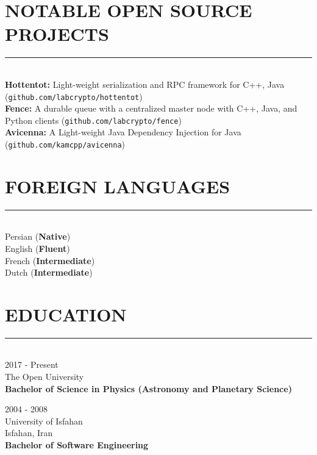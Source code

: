 \documentclass[10pt,a4paper]{article}
\begin{document}

\section{NOTABLE OPEN SOURCE PROJECTS}
\noindent \rule {18.0cm}{0.2pt} \\
    \textbullet \hspace{0.05cm} \textbf{Hottentot:} Light-weight serialization and RPC framework for C++, Java (\texttt{github.com/labcrypto/hottentot}) \\
    \textbullet \hspace{0.05cm} \textbf{Fence:} A durable queue with a centralized master node with C++, Java, and Python clients (\texttt{github.com/labcrypto/fence}) \\
    \textbullet \hspace{0.05cm} \textbf{Avicenna:} A Light-weight Java Dependency Injection for Java  (\texttt{github.com/kamcpp/avicenna}) \\
    
\section{FOREIGN LANGUAGES}
\noindent \rule {18.0cm}{0.2pt} \\
    \textbullet \hspace{0.05cm} Persian (\textbf{Native}) \\
    \textbullet \hspace{0.05cm} English (\textbf{Fluent}) \\
    \textbullet \hspace{0.05cm} French (\textbf{Intermediate}) \\
    \textbullet \hspace{0.05cm} Dutch (\textbf{Intermediate}) \\

\section{EDUCATION}
\noindent \rule {18.0cm}{0.2pt} \\
\textbullet \hspace{0.1cm} 2017 - Present \\
The Open University \\
\textbf{Bachelor of Science in Physics (Astronomy and Planetary Science)}
\vspace{0.3cm}

\noindent \textbullet \hspace{0.1cm}  2004 - 2008 \\
University of Isfahan \\
Isfahan, Iran \\
\textbf{Bachelor of Software Engineering}
\end{document}
